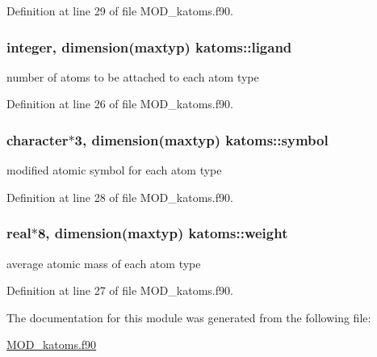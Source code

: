 Definition at line 29 of file M\-O\-D\-\_\-katoms.\-f90.

\hypertarget{classkatoms_ac1a3e0efb04c0c1ae4ff6a6e55becfb8}{
\subsubsection[{ligand}]{\setlength{\rightskip}{0pt plus 5cm}integer, dimension(maxtyp) katoms\-::ligand}}\label{classkatoms_ac1a3e0efb04c0c1ae4ff6a6e55becfb8}


number of atoms to be attached to each atom type 



Definition at line 26 of file M\-O\-D\-\_\-katoms.\-f90.

\hypertarget{classkatoms_a8ad577dbab24116cac34487a69082930}{
\subsubsection[{symbol}]{\setlength{\rightskip}{0pt plus 5cm}character$\ast$3, dimension(maxtyp) katoms\-::symbol}}\label{classkatoms_a8ad577dbab24116cac34487a69082930}


modified atomic symbol for each atom type 



Definition at line 28 of file M\-O\-D\-\_\-katoms.\-f90.

\hypertarget{classkatoms_aca65b59a33d15ee8d54d0fa19e728184}{
\subsubsection[{weight}]{\setlength{\rightskip}{0pt plus 5cm}real$\ast$8, dimension(maxtyp) katoms\-::weight}}\label{classkatoms_aca65b59a33d15ee8d54d0fa19e728184}


average atomic mass of each atom type 



Definition at line 27 of file M\-O\-D\-\_\-katoms.\-f90.



The documentation for this module was generated from the following file\-:\begin{DoxyCompactItemize}
\item 
\hyperlink{MOD__katoms_8f90}{M\-O\-D\-\_\-katoms.\-f90}\end{DoxyCompactItemize}
